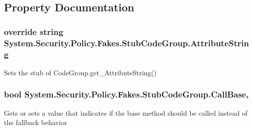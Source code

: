 \subsection{Property Documentation}
\hypertarget{class_system_1_1_security_1_1_policy_1_1_fakes_1_1_stub_code_group_a62e8b0178f1f9d1cfc53830684c8f287}{
\subsubsection[{Attribute\-String}]{\setlength{\rightskip}{0pt plus 5cm}override string System.\-Security.\-Policy.\-Fakes.\-Stub\-Code\-Group.\-Attribute\-String\hspace{0.3cm}{\ttfamily [get]}}}\label{class_system_1_1_security_1_1_policy_1_1_fakes_1_1_stub_code_group_a62e8b0178f1f9d1cfc53830684c8f287}


Sets the stub of Code\-Group.\-get\-\_\-\-Attribute\-String()

\hypertarget{class_system_1_1_security_1_1_policy_1_1_fakes_1_1_stub_code_group_aad1cff130eef9e7783a7e8b6aec1e415}{
\subsubsection[{Call\-Base}]{\setlength{\rightskip}{0pt plus 5cm}bool System.\-Security.\-Policy.\-Fakes.\-Stub\-Code\-Group.\-Call\-Base\hspace{0.3cm}{\ttfamily [get]}, {\ttfamily [set]}}}\label{class_system_1_1_security_1_1_policy_1_1_fakes_1_1_stub_code_group_aad1cff130eef9e7783a7e8b6aec1e415}


Gets or sets a value that indicates if the base method should be called instead of the fallback behavior

